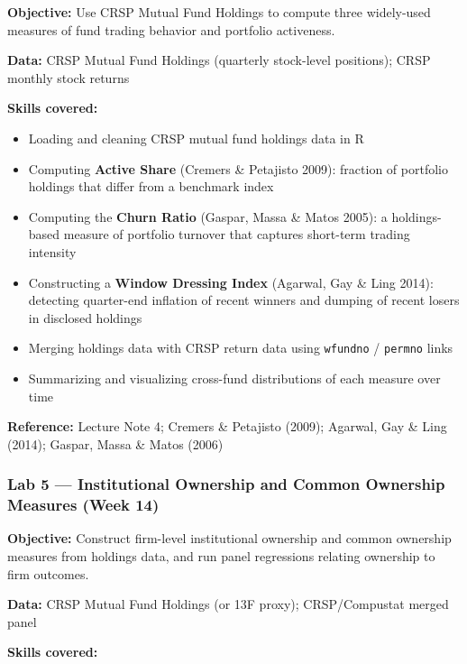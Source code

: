 \documentclass[
  12pt,
  letterpaper,
  DIV=11,
  numbers=noendperiod]{scrartcl}
\providecommand{\tightlist}{%
  \setlength{\itemsep}{0pt}\setlength{\parskip}{0pt}}
\begin{document}
\textbf{Objective:} Use CRSP Mutual Fund Holdings to compute three
widely-used measures of fund trading behavior and portfolio activeness.

\textbf{Data:} CRSP Mutual Fund Holdings (quarterly stock-level
positions); CRSP monthly stock returns

\textbf{Skills covered:}

\begin{itemize}
\tightlist
\item
  Loading and cleaning CRSP mutual fund holdings data in R
\item
  Computing \textbf{Active Share} (Cremers \& Petajisto 2009): fraction
  of portfolio holdings that differ from a benchmark index
\item
  Computing the \textbf{Churn Ratio} (Gaspar, Massa \& Matos 2005): a
  holdings-based measure of portfolio turnover that captures short-term
  trading intensity
\item
  Constructing a \textbf{Window Dressing Index} (Agarwal, Gay \& Ling
  2014): detecting quarter-end inflation of recent winners and dumping
  of recent losers in disclosed holdings
\item
  Merging holdings data with CRSP return data using \texttt{wfundno} /
  \texttt{permno} links
\item
  Summarizing and visualizing cross-fund distributions of each measure
  over time
\end{itemize}

\textbf{Reference:} Lecture Note 4; Cremers \& Petajisto (2009);
Agarwal, Gay \& Ling (2014); Gaspar, Massa \& Matos (2006)

\subsubsection{Lab 5 --- Institutional Ownership and Common Ownership
Measures (Week
14)}\label{lab-5-institutional-ownership-and-common-ownership-measures-week-14}

\textbf{Objective:} Construct firm-level institutional ownership and
common ownership measures from holdings data, and run panel regressions
relating ownership to firm outcomes.

\textbf{Data:} CRSP Mutual Fund Holdings (or 13F proxy); CRSP/Compustat
merged panel

\textbf{Skills covered:}
\end{document}

